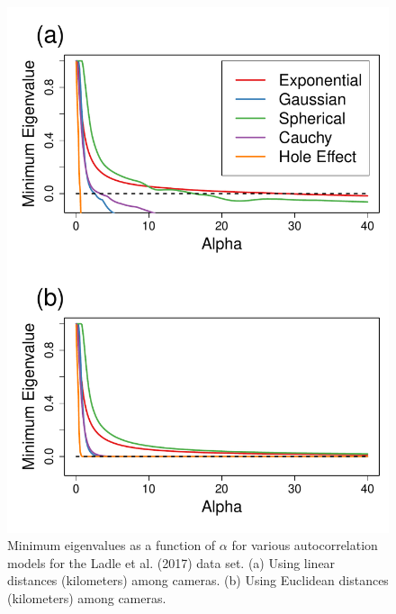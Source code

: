 \documentclass[11pt, titlepage]{article}\usepackage[]{graphicx}\usepackage[]{color}
\begin{document}
\begin{spacing}{1.9}
\begin{flushleft}
\begin{singlespace}


	\begin{figure}[H]
	  \begin{center}
	    \includegraphics[width=.7\linewidth]{figure/Fig-realDatEigVals-1.pdf}
	  \end{center}
	  \caption{Minimum eigenvalues as a function of $\alpha$ for various autocorrelation models for the Ladle et al. (2017) data set. (a) Using linear distances (kilometers) among cameras. (b) Using Euclidean distances (kilometers) among cameras.  \label{fig:realLinDistEigVals}}
  \end{figure}




\end{singlespace}
\end{flushleft}
\end{spacing}
\end{document}
